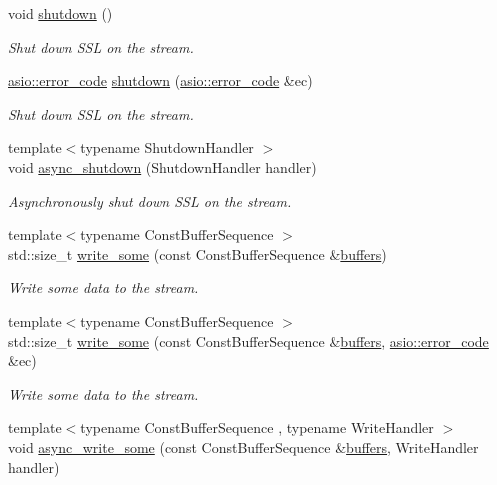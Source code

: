 \begin{DoxyCompactItemize}
void \hyperlink{classasio_1_1ssl_1_1old_1_1stream_a6067ec453251827936bcc62058a6c592}{shutdown} ()
\begin{DoxyCompactList}\small\item\em Shut down S\+S\+L on the stream. \end{DoxyCompactList}\item 
\hyperlink{classasio_1_1error__code}{asio\+::error\+\_\+code} \hyperlink{classasio_1_1ssl_1_1old_1_1stream_ac72e660505e1880675fe99d6c7dc5b9c}{shutdown} (\hyperlink{classasio_1_1error__code}{asio\+::error\+\_\+code} \&ec)
\begin{DoxyCompactList}\small\item\em Shut down S\+S\+L on the stream. \end{DoxyCompactList}\item 
{\footnotesize template$<$typename Shutdown\+Handler $>$ }\\void \hyperlink{classasio_1_1ssl_1_1old_1_1stream_a523d381e2548587dc0ac216292572f11}{async\+\_\+shutdown} (Shutdown\+Handler handler)
\begin{DoxyCompactList}\small\item\em Asynchronously shut down S\+S\+L on the stream. \end{DoxyCompactList}\item 
{\footnotesize template$<$typename Const\+Buffer\+Sequence $>$ }\\std\+::size\+\_\+t \hyperlink{classasio_1_1ssl_1_1old_1_1stream_a5c46226ee7670e8b246045d7083f3dc3}{write\+\_\+some} (const Const\+Buffer\+Sequence \&\hyperlink{group__async__read_ga54dede45c3175148a77fe6635222c47d}{buffers})
\begin{DoxyCompactList}\small\item\em Write some data to the stream. \end{DoxyCompactList}\item 
{\footnotesize template$<$typename Const\+Buffer\+Sequence $>$ }\\std\+::size\+\_\+t \hyperlink{classasio_1_1ssl_1_1old_1_1stream_a8e60094fcd1c78f221157b2d1e7ecaa9}{write\+\_\+some} (const Const\+Buffer\+Sequence \&\hyperlink{group__async__read_ga54dede45c3175148a77fe6635222c47d}{buffers}, \hyperlink{classasio_1_1error__code}{asio\+::error\+\_\+code} \&ec)
\begin{DoxyCompactList}\small\item\em Write some data to the stream. \end{DoxyCompactList}\item 
{\footnotesize template$<$typename Const\+Buffer\+Sequence , typename Write\+Handler $>$ }\\void \hyperlink{classasio_1_1ssl_1_1old_1_1stream_a92ca80ae61f3a80ef7fdc5eca375f85e}{async\+\_\+write\+\_\+some} (const Const\+Buffer\+Sequence \&\hyperlink{group__async__read_ga54dede45c3175148a77fe6635222c47d}{buffers}, Write\+Handler handler)

\end{DoxyCompactItemize}
